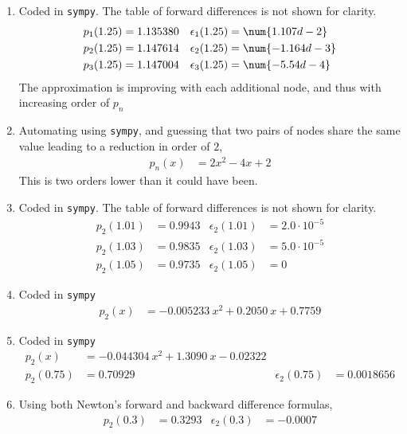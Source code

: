 \begin{enumerate}
    \item Coded in \texttt{sympy}. The table of forward differences is not shown
          for clarity.
          \begin{align}
              p_1(1.25) & = 1.135380 & \epsilon_1(1.25) & = \num{1.107d-2}  \\
              p_2(1.25) & = 1.147614 & \epsilon_2(1.25) & = \num{-1.164d-3} \\
              p_3(1.25) & = 1.147004 & \epsilon_3(1.25) & = \num{-5.54d-4}
          \end{align}
          The approximation is improving with each additional node, and thus with
          increasing order of $ p_n $

    \item Automating using \texttt{sympy}, and guessing that two pairs of nodes share the
          same value leading to a reduction in order of $ 2 $,
          \begin{align}
              p_n(x) & = 2x^2 - 4x + 2
          \end{align}
          This is two orders lower than it could have been.

    \item Coded in \texttt{sympy}. The table of forward differences is not shown
          for clarity.
          \begin{align}
              p_2(1.01) & = 0.9943 & \epsilon_2(1.01) & = 2.0 \cdot 10^{-5} \\
              p_2(1.03) & = 0.9835 & \epsilon_2(1.03) & = 5.0 \cdot 10^{-5} \\
              p_2(1.05) & = 0.9735 & \epsilon_2(1.05) & = 0
          \end{align}

    \item Coded in \texttt{sympy}
          \begin{align}
              p_2(x) & = -0.005233\ x^2 + 0.2050\ x + 0.7759
          \end{align}

    \item Coded in \texttt{sympy}
          \begin{align}
              p_2(x)           & = -0.044304\ x^2 + 1.3090\ x - 0.02322   \\
              p_2(0.75)        & = 0.70929                              &
              \epsilon_2(0.75) & = 0.0018656
          \end{align}

    \item Using both Newton's forward and backward difference formulas,
          \begin{align}
              p_2(0.3) & = 0.3293 & \epsilon_2(0.3) & = -0.0007
          \end{align}


\end{enumerate}

